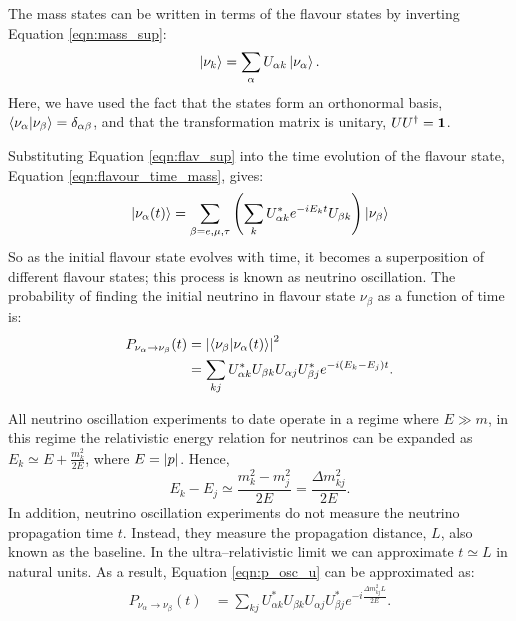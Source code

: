 The mass states can be written in terms of the flavour states by inverting
Equation \ref{eqn:mass_sup}:
\begin{equation}
	\label{eqn:flav_sup}
	\ket{\nu_k} = \sum_\alpha U_{\alpha k} \ket{\nu_\alpha}.
\end{equation}
Here, we have used the fact that the states form an orthonormal basis,
\(\braket{\nu_\alpha}{\nu_\beta} = \delta_{\alpha \beta}\), and that the 
transformation matrix is unitary, \(UU^\dagger = \vb{1}\).

Substituting Equation \ref{eqn:flav_sup} into the time evolution of the flavour
state, Equation \ref{eqn:flavour_time_mass}, gives:
\begin{equation}
	\label{eqn:flavour_time_flav}
	\ket{\nu_\alpha(t)} = \sum_{\beta = e, \mu, \tau} \left(\sum_k
	U^*_{\alpha k} e^{-iE_kt} U_{\beta k} \right) \ket{\nu_{\beta}} 
\end{equation}
So as the initial flavour state evolves with time, it becomes a superposition 
of different flavour states; this process is known as neutrino oscillation.
The probability of finding the initial neutrino in flavour state \(\nu_\beta\) 
as a function of time is:
\begin{align}
	\label{eqn:p_osc_u}
	P_{\nu_\alpha \rightarrow \nu_\beta}(t) &= \abs{\braket{\nu_\beta}{\nu_\alpha(t)}}^2 \\
	                               &= \sum_{kj} U^*_{\alpha k} U_{\beta k} U_{\alpha j} U^*_{\beta j} e^{-i(E_k - E_j)t}.
\end{align}

All neutrino oscillation experiments to date operate in a regime where 
\(E \gg m\), in this regime the relativistic energy relation for neutrinos can 
be expanded as \({E_k \simeq E + \frac{m_k^2}{2E}}\), where \(E = \abs{p}\). 
Hence, 
\begin{equation}
	\label{eqn:energy_diff}
	E_k - E_j \simeq \frac{m_k^2 - m_j^2}{2E} = \frac{\Delta m_{kj}^2}{2E}.
\end{equation}
In addition, neutrino oscillation experiments do not measure the neutrino
propagation time \(t\). Instead, they measure the propagation distance, \(L\), 
also known as the baseline. In the ultra--relativistic limit we can approximate 
\({t \simeq L}\) in natural units. As a result, Equation \ref{eqn:p_osc_u} can be
approximated as:
\begin{align}
	\label{eqn:p_osc_u_l}
	P_{\nu_\alpha \rightarrow \nu_\beta}(t) &= \sum_{kj} U^*_{\alpha k} U_{\beta k} U_{\alpha j} U^*_{\beta j} e^{-i\frac{\Delta m^2_{kj}L}{2E}}.
\end{align}

